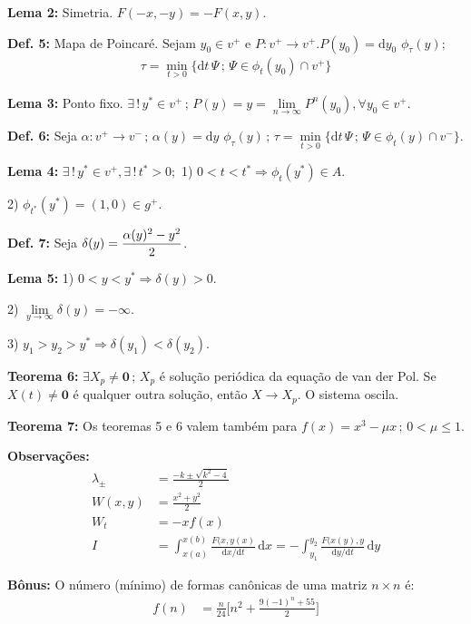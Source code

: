 \documentclass[10pt,a4paper]{article}
\begin{document}
\textbf{Lema 2:} Simetria. $F(-x, -y) = -F(x,y)$.

\textbf{Def. 5:} Mapa de Poincar\'e. Sejam $y_0 \in v^+$ e $P: v^+ \rightarrow v^+. P(y_0) = \mathrm{d}y_0\,\,\phi_\tau(y) ;$
\begin{align}
  \tau = \underset{t > 0}{\operatorname{\min}} \{ \mathrm{d}t\,\Psi \,;\, \Psi \in \phi_t(y_0) \cap v^+ \}
\end{align}

\textbf{Lema 3:} Ponto fixo. $\exists\,!\, y^* \in v^+ \,;\, P(y) = y = \underset{n \rightarrow \infty}{\operatorname{\lim}} P^n(y_0), \forall y_0 \in v^+$.

\textbf{Def. 6:} Seja $\alpha: v^+ \rightarrow v^- \,;\, \alpha(y) = \mathrm{d}y\,\,\phi_\tau(y) \,;\, \tau = \underset{t > 0}{\operatorname{\min}} \{ \mathrm{d}t\,\Psi \,;\, \Psi \in \phi_t(y) \cap v^- \}$.

\textbf{Lema 4:} $\exists\,!\, y^* \in v^+, \exists\,!\, t^* > 0;$ 1) $0 < t < t^* \Rightarrow \phi_t(y^*) \in A.$

2) $\phi_{t^*}(y^*) = (1,0) \in g^+$.

\textbf{Def. 7:} Seja $\delta(y) = \genfrac{}{}{}{0}{\alpha(y)^2 - y^2}{2}$.

\textbf{Lema 5:} 1) $0 < y < y^* \Rightarrow \delta(y) > 0.$

2) $\underset{y \rightarrow \infty}{\operatorname{\lim}} \delta(y) = -\infty.$

3) $y_1 > y_2 > y^* \Rightarrow \delta(y_1) < \delta(y_2)$.

\textbf{Teorema 6:} $\exists X_p \neq \mathbf{0} \,;\, X_p$ \'e solu\c{c}\~ao peri\'odica da equa\c{c}\~ao de van der Pol. Se $X(t) \neq \mathbf{0}$ \'e qualquer outra solu\c{c}\~ao, ent\~ao $X \rightarrow X_p$. O sistema oscila.

\textbf{Teorema 7:} Os teoremas 5 e 6 valem tamb\'em para $f(x) = x^3 - \mu x\,;\, 0 < \mu \le 1$.

\textbf{Observa\c{c}\~oes:}
\begin{align}
  \lambda_\pm &= \frac{-k \pm \sqrt{k^2 - 4}}{2} \\
  W(x,y) &= \frac{x^2 + y^2}{2} \\
  W_t &= -x f(x) \\
  I &= \int_{x(a)}^{x(b)} \frac{F(x, y(x)}{\mathrm{d}x/\mathrm{d}t} \,\mathrm{d}x = - \int_{y_1}^{y_2} \frac{F(x(y), y}{\mathrm{d}y/\mathrm{d}t} \,\mathrm{d}y
\end{align}

\textbf{B\^onus:} O n\'umero (m\'inimo) de formas can\^onicas de uma matriz $n \times n$ \'e:
\begin{align*}
  f(n) &= \frac{n}{24} \biggl[ n^2 + \frac{9(-1)^n + 55}{2} \biggr]
\end{align*}
\end{document}

